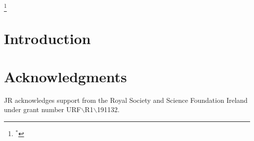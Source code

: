 \documentclass[twocolumn,iop,revtex4]{openjournal}
\begin{document}
\title[]{}
\author{Hannah O'Brennan$^{1,*}$}
\thanks{$^*$}
\author{John A. Regan$^{1}$}


\begin{abstract}
\end{abstract}

\keywords{}

\section{Introduction} \label{Sec:Introduction}

\section*{Acknowledgments}

\noindent JR acknowledges support from the Royal Society and Science Foundation Ireland under
grant number URF$\backslash$R1$\backslash$191132.

\label{lastpage}


\end{document}
